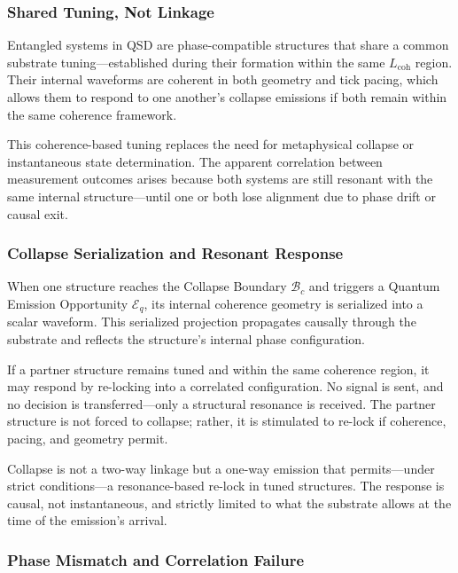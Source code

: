 \documentclass[entropy,article,submit,pdftex,moreauthors]{Definitions/mdpi}
\begin{document}
\subsubsection{Shared Tuning, Not Linkage}

Entangled systems in QSD are phase-compatible structures that share a common substrate tuning—established during their formation within the same \( L_{\text{coh}} \) region. Their internal waveforms are coherent in both geometry and tick pacing, which allows them to respond to one another’s collapse emissions if both remain within the same coherence framework.

This coherence-based tuning replaces the need for metaphysical collapse or instantaneous state determination. The apparent correlation between measurement outcomes arises because both systems are still resonant with the same internal structure—until one or both lose alignment due to phase drift or causal exit.

\subsubsection{Collapse Serialization and Resonant Response}

When one structure reaches the Collapse Boundary \( \mathcal{B}_c \) and triggers a Quantum Emission Opportunity \( \mathcal{E}_q \), its internal coherence geometry is serialized into a scalar waveform. This serialized projection propagates causally through the substrate and reflects the structure's internal phase configuration.

If a partner structure remains tuned and within the same coherence region, it may respond by re-locking into a correlated configuration. No signal is sent, and no decision is transferred—only a structural resonance is received. The partner structure is not forced to collapse; rather, it is stimulated to re-lock if coherence, pacing, and geometry permit.

Collapse is not a two-way linkage but a one-way emission that permits—under strict conditions—a resonance-based re-lock in tuned structures. The response is causal, not instantaneous, and strictly limited to what the substrate allows at the time of the emission’s arrival.

\subsubsection{Phase Mismatch and Correlation Failure}
\end{document}
